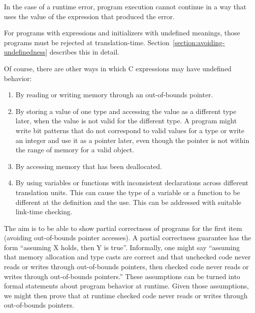 In the case of a runtime error, program execution cannot continue in a
way that uses the value of the expression that produced the error.

For programs with expressions and initializers with undefined meanings,
those programs must be rejected at translation-time. 
Section~\ref{section:avoiding-undefinedness}
describes this in detail.

Of course, there are other ways in which C expressions may have
undefined behavior:

\begin{enumerate}
\item
  By reading or writing memory through an out-of-bounds pointer.
\item
  By storing a value of one type and accessing the value as a different
  type later, when the value is not valid for the different type. A
  program might write bit patterns that do not correspond to valid
  values for a type or write an integer and use it as a pointer later,
  even though the pointer is not within the range of memory for a valid
  object.
\item
  By accessing memory that has been deallocated.
\item
  By using variables or functions with inconsistent declarations across
  different translation units. This can cause the type of a variable or
  a function to be different at the definition and the use. This can be
  addressed with suitable link-time checking.
\end{enumerate}

The aim is to be able to show partial correctness of programs for the
first item (avoiding out-of-bounds pointer accesses). A
partial correctness guarantee has the form ``assuming X holds, then Y is
true''. Informally, one might say ``assuming that memory allocation and
type casts are correct and that unchecked code never reads or writes through
out-of-bounds pointers, then checked code never reads or writes through
out-of-bounds pointers.'' These assumptions can be turned into formal
statements about program behavior at runtime. Given those assumptions,
we might then prove that at runtime checked code never reads or writes
through out-of-bounds pointers.
